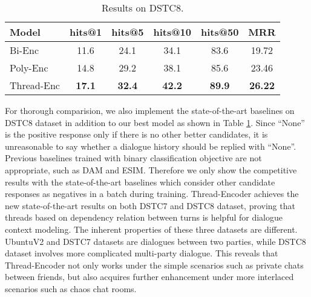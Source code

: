 \begin{table}[th!]
	\centering
	\scriptsize
	\begin{tabular}{lccccc}%
		\toprule[1pt]
		Model & hits@1 & hits@5 & hits@10 & hits@50 & MRR  \\
		\midrule[1pt]
		Bi-Enc & 11.6 & 24.1 & 34.1 & 83.6 & 19.72 \\

		Poly-Enc & 14.8 & 29.2 & 38.1 & 85.6 & 23.46  \\
		\hline
		Thread-Enc & \bf 17.1 & \bf 32.4 & \bf 42.2 & \bf 89.9 & \bf 26.22  \\
		\bottomrule[1pt]
	\end{tabular}
	\caption{Results on DSTC8.}
	\label{tab:dstc8}
\end{table}

For thorough comparision, we also implement the state-of-the-art baselines on 
DSTC8 dataset in addition to our best model as shown in Table \ref{tab:dstc8}. 
Since ``None'' is the positive response only if there is no other better candidates, it is unreasonable to say whether a dialogue history should be replied with ``None''. Previous baselines trained with binary classification objective are not appropriate, such as DAM and ESIM.
Therefore we only show the competitive results with the state-of-the-art baselines 
which consider other candidate responses as negatives in a batch during training.
Thread-Encoder achieves the new state-of-the-art results on both DSTC7 and DSTC8 dataset, 
proving that threads based on dependency relation between turns is helpful for dialogue context modeling. The inherent properties of these three datasets are different. UbuntuV2 and DSTC7 datasets are dialogues between two parties, while DSTC8 dataset involves more complicated multi-party dialogue. This reveals that Thread-Encoder not only works under the simple scenarios such as private chats between friends, but also acquires further enhancement under more interlaced scenarios such as chaos chat rooms. 


